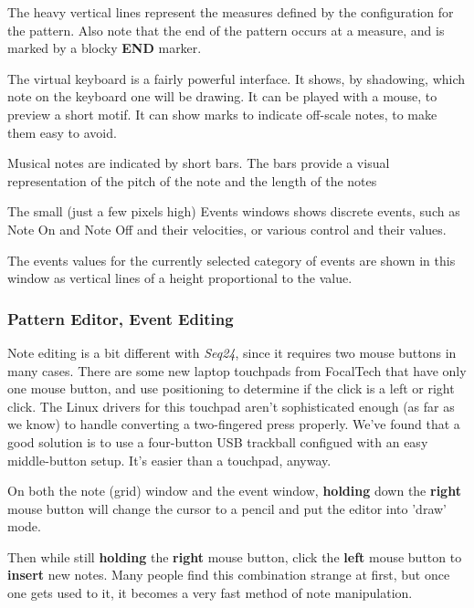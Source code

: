    The heavy vertical lines represent the measures defined by the configuration
   for the pattern.  Also note that the end of the pattern occurs at a
   measure, and is marked by a blocky \textbf{END} marker.

   The virtual keyboard is a fairly powerful interface.  It shows,
   by shadowing, which note on the keyboard one will be drawing. It can be
   played with a mouse, to preview a short motif.
   It can show marks to indicate off-scale notes, to make them easy to
   avoid.

   Musical notes are indicated by short bars.  The bars provide a visual
   representation of the pitch of the note and the length of the notes

   The small (just a few pixels high) Events windows shows discrete events,
   such as Note On and Note Off and their velocities, or various control and
   their values.

   The events values for the currently selected category of events are shown
   in this window as vertical lines of a height proportional to the value.

\subsubsection{Pattern Editor, Event Editing}
\label{subsubsec:seq24_pattern_editor_event_editing}

   Note editing is a bit different with \textsl{Seq24}, since it
   requires two mouse buttons in many cases.  There are some new
   laptop touchpads from FocalTech that have only one mouse button, and
   use positioning to determine if the click is a left or right click.
   The Linux drivers for this touchpad aren't sophisticated enough (as far
   as we know) to handle converting a two-fingered press properly.
   We've found that a good solution is to use a four-button USB trackball
   configued with an easy middle-button setup.
   It's easier than a touchpad, anyway.

	On both the note (grid) window and the event window, \textbf{holding}
	down the \textbf{right} mouse button will change the cursor
	to a pencil and put the editor into 'draw' mode.
   
   Then while still \textbf{holding} the \textbf{right} mouse button, click
   the \textbf{left} mouse button to \textbf{insert} new notes.  Many people
   find this combination strange at first, but once one gets used to it, it
   becomes a very fast method of note manipulation.

